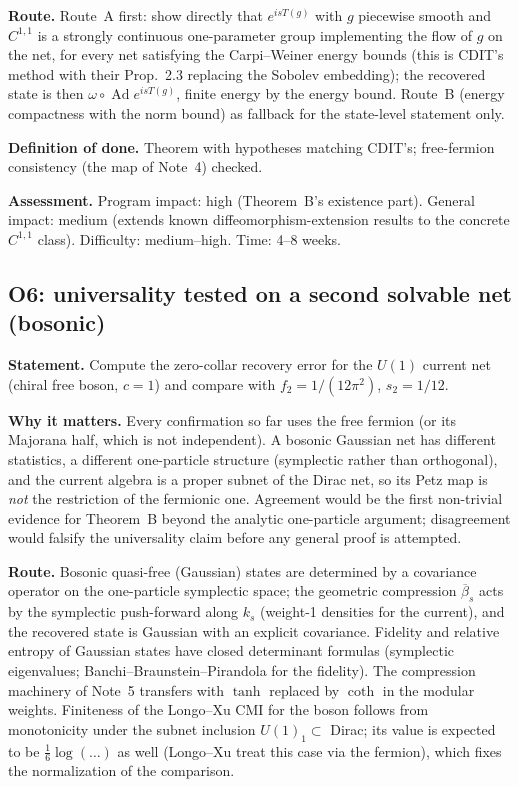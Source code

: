 \documentclass[11pt]{article}
\theoremstyle{accent}
\theoremstyle{definition}
\newcommand{\Ad}{\operatorname{Ad}}
\begin{document}
\textbf{Route.} Route~A first: show directly that \(e^{isT(g)}\) with \(g\) piecewise smooth and \(C^{1,1}\) is a strongly continuous one-parameter group implementing the flow of \(g\) on the net, for every net satisfying the Carpi--Weiner energy bounds (this is CDIT's method with their Prop.~2.3 replacing the Sobolev embedding); the recovered state is then \(\omega\circ\Ad e^{isT(g)}\), finite energy by the energy bound.  Route~B (energy compactness with the norm bound) as fallback for the state-level statement only.

\textbf{Definition of done.} Theorem with hypotheses matching CDIT's; free-fermion consistency (the map of Note~4) checked.

\textbf{Assessment.} Program impact: high (Theorem~B's existence part).  General impact: medium (extends known diffeomorphism-extension results to the concrete \(C^{1,1}\) class).  Difficulty: medium--high.  Time: 4--8 weeks.

\subsection{O6: universality tested on a second solvable net (bosonic)}\label{sec:O6}
\textbf{Statement.} Compute the zero-collar recovery error for the \(U(1)\) current net (chiral free boson, \(c=1\)) and compare with \(f_2=1/(12\pi^2)\), \(s_2=1/12\).

\textbf{Why it matters.} Every confirmation so far uses the free fermion (or its Majorana half, which is not independent).  A bosonic Gaussian net has different statistics, a different one-particle structure (symplectic rather than orthogonal), and the current algebra is a proper subnet of the Dirac net, so its Petz map is \emph{not} the restriction of the fermionic one.  Agreement would be the first non-trivial evidence for Theorem~B beyond the analytic one-particle argument; disagreement would falsify the universality claim before any general proof is attempted.

\textbf{Route.} Bosonic quasi-free (Gaussian) states are determined by a covariance operator on the one-particle symplectic space; the geometric compression \(\overline\beta_s\) acts by the symplectic push-forward along \(k_s\) (weight-1 densities for the current), and the recovered state is Gaussian with an explicit covariance.  Fidelity and relative entropy of Gaussian states have closed determinant formulas (symplectic eigenvalues; Banchi--Braunstein--Pirandola for the fidelity).  The compression machinery of Note~5 transfers with \(\tanh\) replaced by \(\coth\) in the modular weights.  Finiteness of the Longo--Xu CMI for the boson follows from monotonicity under the subnet inclusion \(U(1)_1\subset\) Dirac; its value is expected to be \(\frac16\log(\dots)\) as well (Longo--Xu treat this case via the fermion), which fixes the normalization of the comparison.
\end{document}
